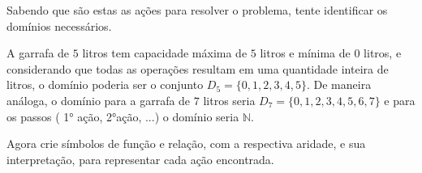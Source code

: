 \begin{enumerate}
    
    Sabendo que são estas as ações para resolver o problema, tente identificar os domínios necessários.
    
    \vspace{0.2cm}
    
    
    A garrafa de $5$ litros tem capacidade máxima de $5$ litros e mínima de $0$ litros, e considerando que todas as operações resultam em uma quantidade inteira de litros, o domínio poderia ser o conjunto $D_5 = \{0, 1, 2, 3, 4, 5\}$. De maneira análoga, o domínio para a garrafa de $7$ litros seria $D_7 = \{0, 1, 2, 3, 4, 5, 6, 7\}$  e para os passos ( 1° ação, 2°ação, ...) o domínio seria $\mathbb{N}$.
    
    \vspace{0.2cm}
    
    Agora crie símbolos de função e relação, com a respectiva aridade, e sua interpretação, para representar cada ação encontrada.
    
       
    
    \end{enumerate}
